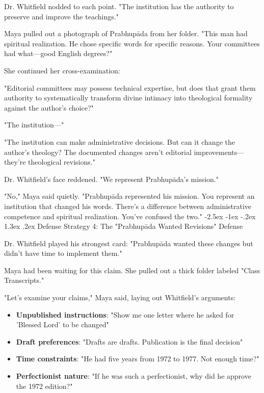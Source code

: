 \documentclass[12pt,twoside]{book}
\makeatletter
\renewcommand\section{\@startsection{section}{1}{\z@}%
{-2.5ex \@plus -1ex \@minus -.2ex}%
{1.3ex \@plus.2ex}%
{\normalfont\Large\bfseries}}
\makeatother
\begin{document}
Dr. Whitfield nodded to each point. "The institution has the authority to preserve and improve the teachings."

Maya pulled out a photograph of Prabhupāda from her folder. "This man had spiritual realization. He chose specific words for specific reasons. Your committees had what—good English degrees?"

She continued her cross-examination:

"Editorial committees may possess technical expertise, but does that grant them authority to systematically transform divine intimacy into theological formality against the author's choice?"

"The institution—"

"The institution can make administrative decisions. But can it change the author's theology? The documented changes aren't editorial improvements—they're theological revisions."

Dr. Whitfield's face reddened. "We represent Prabhupāda's mission."

"No," Maya said quietly. "Prabhupāda represented his mission. You represent an institution that changed his words. There's a difference between administrative competence and spiritual realization. You've confused the two."
\section{Defense Strategy 4: The "Prabhupāda Wanted Revisions" Defense}
\label{sec:orga15ad85}

Dr. Whitfield played his strongest card: "Prabhupāda wanted these changes but didn't have time to implement them."

Maya had been waiting for this claim. She pulled out a thick folder labeled "Class Transcripts."

"Let's examine your claims," Maya said, laying out Whitfield's arguments:

\begin{itemize}
\item \textbf{\textbf{Unpublished instructions}}: "Show me one letter where he asked for 'Blessed Lord' to be changed"
\item \textbf{\textbf{Draft preferences}}: "Drafts are drafts. Publication is the final decision"
\item \textbf{\textbf{Time constraints}}: "He had five years from 1972 to 1977. Not enough time?"
\item \textbf{\textbf{Perfectionist nature}}: "If he was such a perfectionist, why did he approve the 1972 edition?"
\end{itemize}
\end{document}
